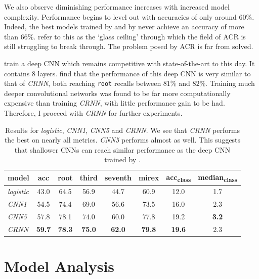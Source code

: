 We also observe diminishing performance increases with increased model complexity. Performance begins to level out with accuracies of only around $60\%$. Indeed, the best models trained by \citet{BTC} and by \citet{ChordFormer} never achieve an accuracy of more than $66\%$. \citet{FourTimelyInsights} refer to this as the `glass ceiling' through which the field of ACR is still struggling to break through. The problem posed by ACR is far from solved.

\citet{FeatureMaps} train a deep CNN which remains competitive with state-of-the-art to this day. It contains 8 layers. \citet{BTC} find that the performance of this deep CNN is very similar to that of \emph{CRNN}, both reaching \texttt{root} recalls between $81\%$ and $82\%$. Training much deeper convolutional networks was found to be far more computationally expensive than training \emph{CRNN}, with little performance gain to be had. Therefore, I proceed with \emph{CRNN} for further experiments.

\begin{table}[h]
    \centering
    \begin{tabular}{lccccccc}
        \toprule
        model & acc & root & third & seventh & mirex & acc\textsubscript{class} & median\textsubscript{class} \\  
        \midrule
        \emph{logistic} & 43.0 & 64.5 & 56.9 & 44.7 & 60.9 & 12.0 & 1.7 \\
        \emph{CNN1} & 54.5 & 74.4 & 69.0 & 56.6 & 73.5 & 16.0 & 2.3 \\
        \emph{CNN5} & 57.8 & 78.1 & 74.0 & 60.0 & 77.8 & 19.2 & \textbf{3.2} \\
        \emph{CRNN} & \textbf{59.7} & \textbf{78.3} & \textbf{75.0} & \textbf{62.0} & \textbf{79.8} & \textbf{19.6} & 2.3 \\
        \bottomrule
    \end{tabular}
    \caption{Results for \emph{logistic}, \emph{CNN1}, \emph{CNN5} and \emph{CRNN}. We see that \emph{CRNN} performs the best on nearly all metrics. \emph{CNN5} performs almost as well. This suggests that shallower CNNs can reach similar performance as the deep CNN trained by \citet{FeatureMaps}.}\label{tab:first_results}
\end{table}

\section{Model Analysis}\label{sec:crnn_analysis}

